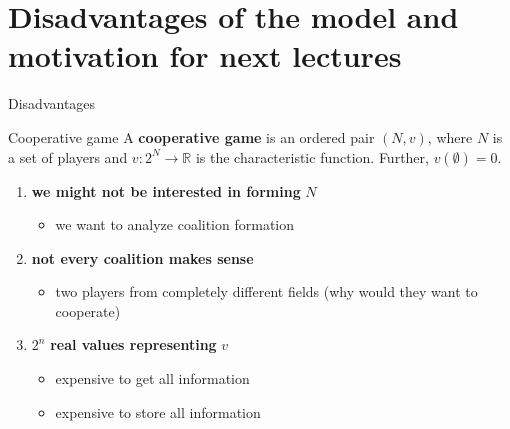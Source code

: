 \documentclass{beamer}
\begin{document}

\section{Disadvantages of the model and motivation for next lectures}


\begin{frame}{Disadvantages}
    \begin{block}{Cooperative game}
        A \textbf{cooperative game} is an ordered pair $(N,v)$, where $N$ is a set of players and $v\colon 2^N \to \mathbb{R}$ is the characteristic function. Further, $v(\emptyset) = 0$.
    \end{block}
	\begin{enumerate}
		\item \textbf{we might not be interested in forming} $N$
		\begin{itemize}
			\item we want to analyze coalition formation
		\end{itemize}
		\item \textbf{not every coalition makes sense}
		\begin{itemize}
			\item two players from completely different fields (why would they want to cooperate)
		\end{itemize}
		\item $2^n$ \textbf{real values representing} $v$
		\begin{itemize}
			\item expensive to get all information
			\item expensive to store all information
		\end{itemize}
	\end{enumerate}
\end{frame}


\end{document}
